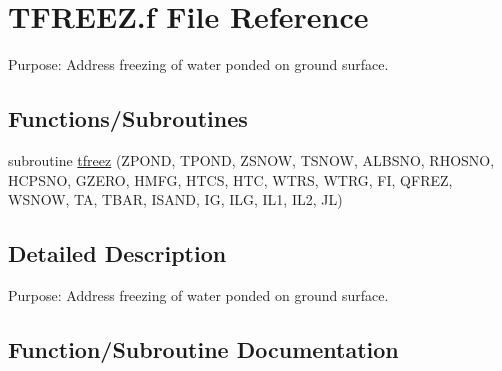 \hypertarget{TFREEZ_8f}{}\section{T\+F\+R\+E\+E\+Z.\+f File Reference}
\label{TFREEZ_8f}


Purpose\+: Address freezing of water ponded on ground surface.  


\subsection*{Functions/\+Subroutines}
\begin{DoxyCompactItemize}
\item 
subroutine \hyperlink{TFREEZ_8f_a4bbb5275f553d198b8e0d750e75d3c3d}{tfreez} (Z\+P\+O\+N\+D, T\+P\+O\+N\+D, Z\+S\+N\+O\+W, T\+S\+N\+O\+W, A\+L\+B\+S\+N\+O, R\+H\+O\+S\+N\+O, H\+C\+P\+S\+N\+O, G\+Z\+E\+R\+O, H\+M\+F\+G, H\+T\+C\+S, H\+T\+C, W\+T\+R\+S, W\+T\+R\+G, F\+I, Q\+F\+R\+E\+Z, W\+S\+N\+O\+W, T\+A, T\+B\+A\+R, I\+S\+A\+N\+D, I\+G, I\+L\+G, I\+L1, I\+L2, J\+L)
\end{DoxyCompactItemize}


\subsection{Detailed Description}
Purpose\+: Address freezing of water ponded on ground surface. 



\subsection{Function/\+Subroutine Documentation}
\hypertarget{TFREEZ_8f_a4bbb5275f553d198b8e0d750e75d3c3d}{}
